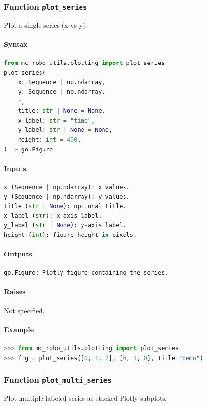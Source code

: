 \documentclass[11pt]{article}
\begin{document}
\subsubsection{Function \texttt{plot\_series}}
Plot a single series (x vs y).

\paragraph{Syntax}
\begin{lstlisting}[language=Python]
from mc_robo_utils.plotting import plot_series
plot_series(
    x: Sequence | np.ndarray,
    y: Sequence | np.ndarray,
    *,
    title: str | None = None,
    x_label: str = "time",
    y_label: str | None = None,
    height: int = 400,
) -> go.Figure
\end{lstlisting}
\paragraph{Inputs}
\begin{lstlisting}[language=Python]
x (Sequence | np.ndarray): x values.
y (Sequence | np.ndarray): y values.
title (str | None): optional title.
x_label (str): x-axis label.
y_label (str | None): y-axis label.
height (int): figure height in pixels.
\end{lstlisting}
\paragraph{Outputs}
\begin{lstlisting}[language=Python]
go.Figure: Plotly figure containing the series.
\end{lstlisting}
\paragraph{Raises}
Not specified.
\paragraph{Example}
\begin{lstlisting}[language=Python]
>>> from mc_robo_utils.plotting import plot_series
>>> fig = plot_series([0, 1, 2], [0, 1, 0], title="demo")
\end{lstlisting}

\subsubsection{Function \texttt{plot\_multi\_series}}
Plot multiple labeled series as stacked Plotly subplots.
\end{document}
